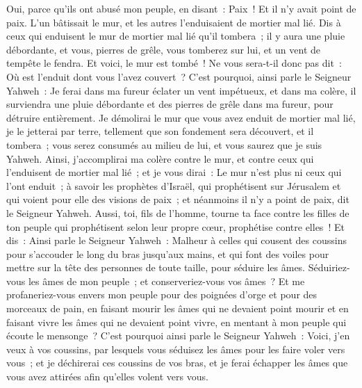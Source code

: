 \begin{multicols}{2}
Oui, parce qu'ils ont abusé mon peuple, en disant~: Paix~! Et il n'y avait point de paix. L'un bâtissait le mur, et les autres l'enduisaient de mortier mal lié.
Dis à ceux qui enduisent le mur de mortier mal lié qu'il tombera~; il y aura une pluie débordante, et vous, pierres de grêle, vous tomberez sur lui, et un vent de tempête le fendra.
Et voici, le mur est tombé~! Ne vous sera-t-il donc pas dit~: Où est l'enduit dont vous l'avez couvert~?
C'est pourquoi, ainsi parle le Seigneur Yahweh~: Je ferai dans ma fureur éclater un vent impétueux, et dans ma colère, il surviendra une pluie débordante et des pierres de grêle dans ma fureur, pour détruire entièrement.
Je démolirai le mur que vous avez enduit de mortier mal lié, je le jetterai par terre, tellement que son fondement sera découvert, et il tombera~; vous serez consumés au milieu de lui, et vous saurez que je suis Yahweh.
Ainsi, j'accomplirai ma colère contre le mur, et contre ceux qui l'enduisent de mortier mal lié~; et je vous dirai~: Le mur n'est plus ni ceux qui l'ont enduit~;
à savoir les prophètes d'Israël, qui prophétisent sur Jérusalem et qui voient pour elle des visions de paix~; et néanmoins il n'y a point de paix, dit le Seigneur Yahweh.
Aussi, toi, fils de l'homme, tourne ta face contre les filles de ton peuple qui prophétisent selon leur propre cœur, prophétise contre elles~!
 Et dis~: Ainsi parle le Seigneur Yahweh~: Malheur à celles qui cousent des coussins pour s'accouder le long du bras jusqu'aux mains, et qui font des voiles pour mettre sur la tête des personnes de toute taille, pour séduire les âmes. Séduiriez-vous les âmes de mon peuple~; et conserveriez-vous vos âmes~?
Et me profaneriez-vous envers mon peuple pour des poignées d'orge et pour des morceaux de pain, en faisant mourir les âmes qui ne devaient point mourir et en faisant vivre les âmes qui ne devaient point vivre, en mentant à mon peuple qui écoute le mensonge~?
C'est pourquoi ainsi parle le Seigneur Yahweh~: Voici, j'en veux à vos coussins, par lesquels vous séduisez les âmes pour les faire voler vers vous~; et je déchirerai ces coussins de vos bras, et je ferai échapper les âmes que vous avez attirées afin qu'elles volent vers vous.

\end{multicols}
